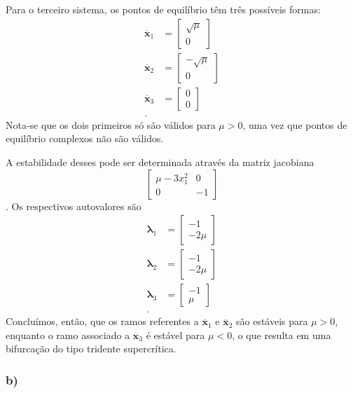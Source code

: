 \documentclass[a4paper]{report}
\begin{document}
Para o terceiro sistema, os pontos de equilíbrio têm três possíveis formas:
\begin{align*}
    \bm{\overline{x}}_1 &= \begin{bmatrix} \sqrt{\mu} \\ 0 \end{bmatrix} \\
    \bm{\overline{x}}_2 &= \begin{bmatrix} -\sqrt{\mu} \\ 0 \end{bmatrix} \\
    \bm{\overline{x}}_3 &= \begin{bmatrix} 0 \\ 0 \end{bmatrix} \\
.\end{align*}
Nota-se que os dois primeiros só são válidos para $\mu>0$, uma vez que pontos de equilíbrio complexos não são válidos.

A estabilidade desses pode ser determinada através da matriz jacobiana \[
    \begin{bmatrix} \mu-3x_1^2 & 0 \\ 0 & -1 \end{bmatrix} 
\]. Os respectivos autovalores são
\begin{align*}
    \bm{\lambda}_1 &= \begin{bmatrix}   -1 \\ -2\mu \end{bmatrix} \\
    \bm{\lambda}_2 &= \begin{bmatrix}   -1 \\ -2\mu \end{bmatrix} \\
    \bm{\lambda}_3 &= \begin{bmatrix}   -1 \\ \mu \end{bmatrix} \\
.\end{align*}
Concluímos, então, que os ramos referentes a $\bm{\overline{x}}_1$ e $\bm{\overline{x}}_2$ são estáveis para $\mu>0$, enquanto o ramo associado a $\bm{\overline{x}}_3$ é estável para $\mu<0$, o que resulta em uma bifurcação do tipo tridente supercrítica.

\subsubsection*{b)}
\end{document}

